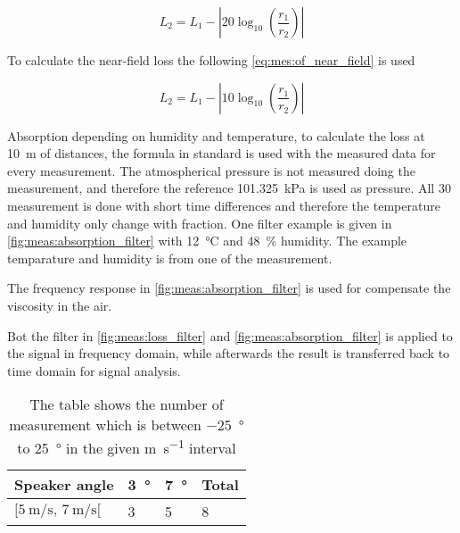 \begin{equation}\label{eq:mes:of_far_field}
L_2 = L_1-\left | 20 \log_{10}(\frac{r_1}{r_2}) \right |
\end{equation}

To calculate the near-field loss the following \autoref{eq:mes:of_near_field} is used 

\begin{equation}\label{eq:mes:of_near_field}
L_2 = L_1-\left | 10 \log_{10}(\frac{r_1}{r_2}) \right |
\end{equation}

 



Absorption depending on humidity and temperature, to calculate the loss at \SI{10}{\meter} of distances, the formula in standard \citep{} is used with the measured data for every measurement. The atmospherical pressure is not measured doing the measurement, and therefore the reference \SI{101.325}{\kilo\pascal} is used as pressure. All 30 measurement is done with short time differences and therefore the temperature and humidity only change with fraction. One filter example is given in \autoref{fig:meas:absorption_filter} with \SI{12}{\celsius} and \SI{48}{\percent} humidity. The example temparature and humidity is from one of the measurement.

  
 
The frequency response in \autoref{fig:meas:absorption_filter} is used for compensate the viscosity in the air. 

Bot the filter in \autoref{fig:meas:loss_filter} and \autoref{fig:meas:absorption_filter} is applied to the signal in frequency domain, while afterwards the result is transferred back to time domain for signal analysis. 
   

\begin{table}[H]
\centering
\caption{The table shows the number of measurement which is between \SI{-25}{\degree} to \SI{25}{\degree} in the given \si{\meter\per\second} interval}
\begin{tabular}{l|l|l|l}
Speaker angle & \SI{3}{\degree}  & \SI{7}{\degree} & Total \\ \hline
$[\SI{5}{\meter\per\second},\, \SI{7}{\meter\per\second}[  $        & 3  & 5  & 8     \\      
\end{tabular}
\label{ta:meas:approved_measurement_par}
\end{table}


